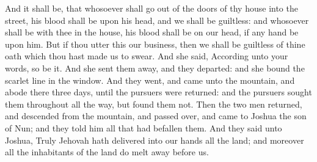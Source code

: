 And it shall be, that whosoever shall go out of the doors of thy house into the street, his blood shall be upon his head, and we shall be guiltless: and whosoever shall be with thee in the house, his blood shall be on our head, if any hand be upon him. But if thou utter this our business, then we shall be guiltless of thine oath which thou hast made us to swear. And she said, According unto your words, so be it. And she sent them away, and they departed: and she bound the scarlet line in the window.  And they went, and came unto the mountain, and abode there three days, until the pursuers were returned: and the pursuers sought them throughout all the way, but found them not. Then the two men returned, and descended from the mountain, and passed over, and came to Joshua the son of Nun; and they told him all that had befallen them. And they said unto Joshua, Truly Jehovah hath delivered into our hands all the land; and moreover all the inhabitants of the land do melt away before us. 

